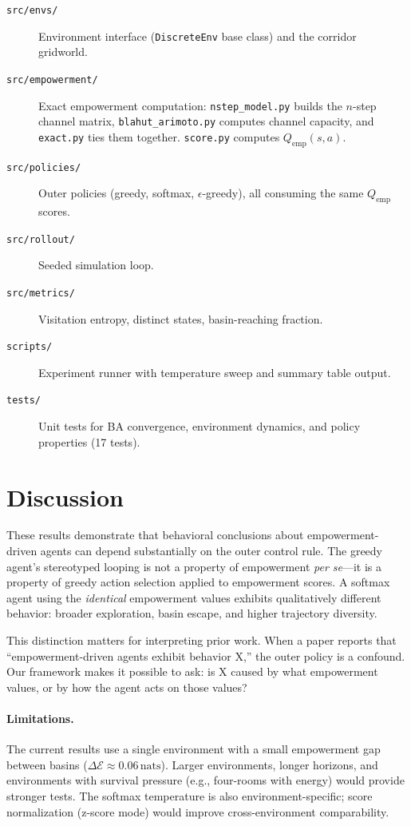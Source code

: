 \documentclass[11pt]{article}
\newcommand{\E}{\mathcal{E}}
\newcommand{\Qemp}{Q_{\mathrm{emp}}}
\newcommand{\nats}{\,\mathrm{nats}}
\begin{document}
\begin{description}
  \item[\texttt{src/envs/}] Environment interface (\texttt{DiscreteEnv}
    base class) and the corridor gridworld.
  \item[\texttt{src/empowerment/}] Exact empowerment computation:
    \texttt{nstep\_model.py} builds the $n$-step channel matrix,
    \texttt{blahut\_arimoto.py} computes channel capacity, and
    \texttt{exact.py} ties them together.  \texttt{score.py} computes
    $\Qemp(s,a)$.
  \item[\texttt{src/policies/}] Outer policies (greedy, softmax,
    $\epsilon$-greedy), all consuming the same $\Qemp$ scores.
  \item[\texttt{src/rollout/}] Seeded simulation loop.
  \item[\texttt{src/metrics/}] Visitation entropy, distinct states,
    basin-reaching fraction.
  \item[\texttt{scripts/}] Experiment runner with temperature sweep
    and summary table output.
  \item[\texttt{tests/}] Unit tests for BA convergence, environment
    dynamics, and policy properties (17 tests).
\end{description}

\section{Discussion}
\label{sec:discussion}

These results demonstrate that behavioral conclusions about
empowerment-driven agents can depend substantially on the outer
control rule.  The greedy agent's stereotyped looping is not a
property of empowerment \emph{per se}---it is a property of greedy
action selection applied to empowerment scores.  A softmax agent using
the \emph{identical} empowerment values exhibits qualitatively
different behavior: broader exploration, basin escape, and higher
trajectory diversity.

This distinction matters for interpreting prior work.  When a paper
reports that ``empowerment-driven agents exhibit behavior X,'' the
outer policy is a confound.  Our framework makes it possible to ask:
is X caused by what empowerment values, or by how the agent acts on
those values?

\paragraph{Limitations.}
The current results use a single environment with a small empowerment
gap between basins ($\Delta \E \approx 0.06\nats$).  Larger
environments, longer horizons, and environments with survival pressure
(e.g., four-rooms with energy) would provide stronger tests.
The softmax temperature is also environment-specific; score
normalization (z-score mode) would improve cross-environment
comparability.
\end{document}
